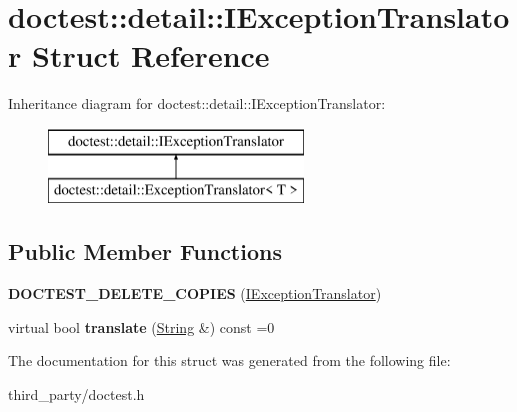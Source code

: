 \hypertarget{structdoctest_1_1detail_1_1_i_exception_translator}{}\section{doctest\+::detail\+::I\+Exception\+Translator Struct Reference}
\label{structdoctest_1_1detail_1_1_i_exception_translator}
Inheritance diagram for doctest\+::detail\+::I\+Exception\+Translator\+:\begin{figure}[H]
\begin{center}
\leavevmode
\includegraphics[height=2.000000cm]{structdoctest_1_1detail_1_1_i_exception_translator}
\end{center}
\end{figure}
\subsection*{Public Member Functions}
\begin{DoxyCompactItemize}
\item 
\mbox{\label{structdoctest_1_1detail_1_1_i_exception_translator_abe0326c24529d9c2df4368bdcca77c9c}} 
{\bfseries D\+O\+C\+T\+E\+S\+T\+\_\+\+D\+E\+L\+E\+T\+E\+\_\+\+C\+O\+P\+I\+ES} (\mbox{\hyperlink{structdoctest_1_1detail_1_1_i_exception_translator}{I\+Exception\+Translator}})
\item 
\mbox{\label{structdoctest_1_1detail_1_1_i_exception_translator_a9c56005e4c83c13b859cc2e31102bfbc}} 
virtual bool {\bfseries translate} (\mbox{\hyperlink{classdoctest_1_1_string}{String}} \&) const =0
\end{DoxyCompactItemize}


The documentation for this struct was generated from the following file\+:\begin{DoxyCompactItemize}
\item 
third\+\_\+party/doctest.\+h\end{DoxyCompactItemize}
